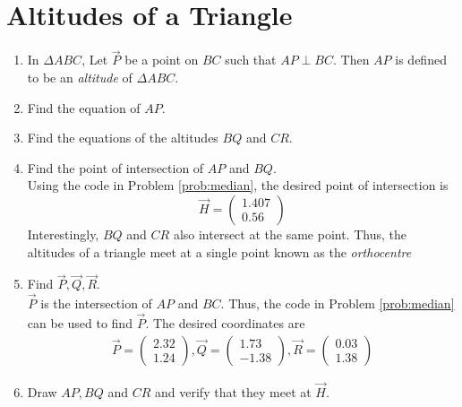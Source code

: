 \documentclass[journal,12pt,twocolumn]{IEEEtran}
\renewcommand\thesection{\arabic{section}}
\begin{document}
\section{Altitudes of a Triangle}
\begin{enumerate}[label=\thesection.\arabic*
,ref=\thesection.\theenumi]
\item
In $\Delta ABC$,  Let $\vec{P}$ be a point on $BC$ such that $AP \perp BC$.  Then $AP$ is defined to be 
an {\em altitude} of $\Delta ABC$.

\item
\label{prob:alt_eq}
Find the equation of $AP$.
%
%
\item
Find the equations of the altitudes $BQ$ and $CR$. 
%
\item
Find the point of intersection of $AP$ and $BQ$.
\\
\solution Using the code in Problem \ref{prob:median}, the desired point of intersection is
%
\begin{equation}
\vec{H} = 
\begin{pmatrix}
 1.407
 \\
 0.56
\end{pmatrix}
\end{equation}
%
Interestingly, $BQ$ and $CR$ also intersect at the same point.  Thus, the altitudes of a triangle
meet at a single point known as the {\em orthocentre}
%
\item
Find $\vec{P},\vec{Q},\vec{R}$.
\\
\solution $\vec{P}$ is the intersection of $AP$ and $BC$.  Thus, the code in Problem \ref{prob:median} can be 
used to find 
$\vec{P}$.  The desired coordinates are
%
\begin{align}
\vec{P} =
\begin{pmatrix}
 2.32
 \\
  1.24
\end{pmatrix}
,
\vec{Q}=
\begin{pmatrix}
 1.73
 \\
 -1.38
\end{pmatrix},
\vec{R}=
\begin{pmatrix}
 0.03
 \\
  1.38
\end{pmatrix}
\end{align}
%
\item
Draw $AP, BQ$ and $CR$ and verify that they meet at $\vec{H}$.  

\end{enumerate}
\end{document}

